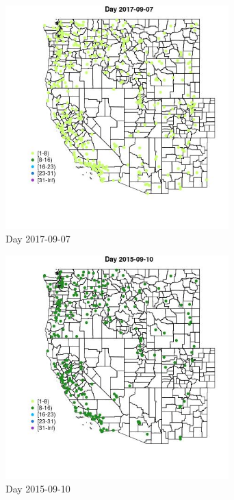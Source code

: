\begin{figure} 
\centering  
\includegraphics[width=0.77\textwidth]{Code_Outputs/Report_ML_input_PM25_Step4_part_e_de_duplicated_aveswNAs_MapObsDay2017-09-07.jpg} 
\caption{\label{fig:Report_ML_input_PM25_Step4_part_e_de_duplicated_aveswNAsMapObsDay2017-09-07}Day 2017-09-07} 
\end{figure} 
 

\begin{figure} 
\centering  
\includegraphics[width=0.77\textwidth]{Code_Outputs/Report_ML_input_PM25_Step4_part_e_de_duplicated_aveswNAs_MapObsDay2015-09-10.jpg} 
\caption{\label{fig:Report_ML_input_PM25_Step4_part_e_de_duplicated_aveswNAsMapObsDay2015-09-10}Day 2015-09-10} 
\end{figure} 
 

